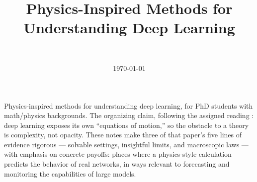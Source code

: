 \documentclass[11pt]{article}
\title{Physics-Inspired Methods for Understanding Deep Learning}
\author{\authorname{Aleksander Czejdo} \and \authorname{Tudor Dimofte}\\ \affiliation{University of Edinburgh} \and \authorname{Brianna Grado-White} \and \authorname{Charles Renshaw-Whitman}} %
\date{\today}
\begin{document}
\maketitle

\begin{summary}
Physics-inspired methods for understanding deep learning, for PhD students
with math/physics backgrounds. The organizing claim, following the assigned
reading \cite{simon2026scientific}: deep learning exposes its own
``equations of motion,'' so the obstacle to a theory is complexity, not
opacity. These notes make three of that paper's five lines of evidence
rigorous --- solvable settings, insightful limits, and macroscopic laws ---
with emphasis on concrete payoffs: places where a physics-style calculation
predicts the behavior of real networks, in ways relevant to forecasting and
monitoring the capabilities of large models.
\end{summary}
\end{document}
